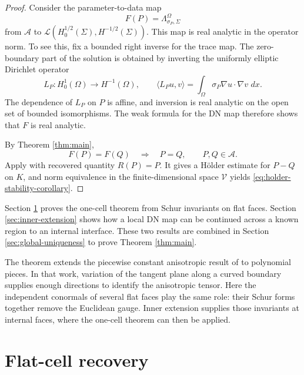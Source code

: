 \documentclass[11pt,oneside]{article}
\newcommand{\dd}{\,d}
\newcommand{\DN}{\Lambda}
\begin{document}
\begin{proof}
Consider the parameter-to-data map
\begin{equation}
  F(P)=\DN^\Omega_{\sigma_P,\Sigma}
\end{equation}
from \(\mathcal A\) to
\(\mathcal L(H^{1/2}_0(\Sigma),H^{-1/2}(\Sigma))\).  This map is real analytic
in the operator norm.  To see this, fix a bounded right inverse for the trace
map.  The zero-boundary part of the solution is obtained by inverting the
uniformly elliptic Dirichlet operator
\begin{equation}
  L_P:H^1_0(\Omega)\to H^{-1}(\Omega),
  \qquad
  \langle L_P u,v\rangle=\int_\Omega \sigma_P\nabla u\cdot\nabla v\,\dd x .
\end{equation}
The dependence of \(L_P\) on \(P\) is affine, and inversion is real analytic on
the open set of bounded isomorphisms.  The weak formula for the DN map therefore
shows that \(F\) is real analytic.

By Theorem \ref{thm:main},
\begin{equation}
  F(P)=F(Q)\quad\Longrightarrow\quad P=Q,
  \qquad P,Q\in\mathcal A .
\end{equation}
Apply \cite[Theorem 3.1]{Carstea2026HolderStability} with recovered quantity
\(R(P)=P\).  It gives a H\"older estimate for \(P-Q\) on \(K\), and norm
equivalence in the finite-dimensional space \(\mathcal V\) yields
\eqref{eq:holder-stability-corollary}.
\end{proof}

Section \ref{sec:flat-cell} proves the one-cell theorem from Schur invariants on
flat faces.  Section \ref{sec:inner-extension} shows how a local DN map can be
continued across a known region to an internal interface.  These two results
are combined in Section \ref{sec:global-uniqueness} to prove Theorem
\ref{thm:main}.

The theorem extends the piecewise constant anisotropic result of
\cite{AlessandriniDeHoopGaburro2017} to polynomial pieces.  In that work,
variation of the tangent plane along a curved boundary supplies enough
directions to identify the anisotropic tensor.  Here the independent conormals
of several flat faces play the same role: their Schur forms together remove the
Euclidean gauge.  Inner extension supplies those invariants at internal faces,
where the one-cell theorem can then be applied.


\section{Flat-cell recovery}
\label{sec:flat-cell}
\end{document}
